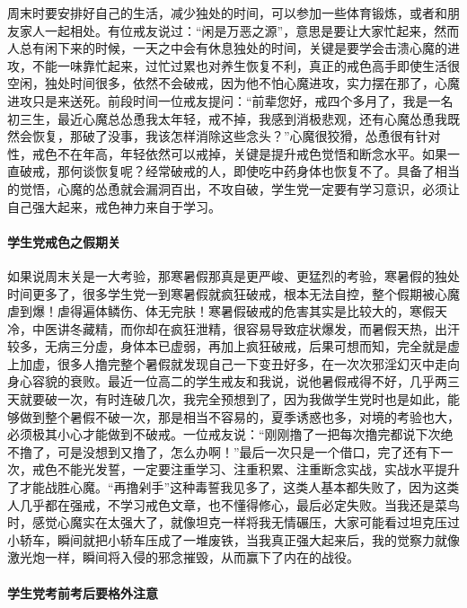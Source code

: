 周末时要安排好自己的生活，减少独处的时间，可以参加一些体育锻炼，或者和朋友家人一起相处。有位戒友说过：“闲是万恶之源”，意思是要让大家忙起来，然而人总有闲下来的时候，一天之中会有休息独处的时间，关键是要学会击溃心魔的进攻，不能一味靠忙起来，过忙过累也对养生恢复不利，真正的戒色高手即使生活很空闲，独处时间很多，依然不会破戒，因为他不怕心魔进攻，实力摆在那了，心魔进攻只是来送死。前段时间一位戒友提问：“前辈您好，戒四个多月了，我是一名初三生，最近心魔总怂恿我太年轻，戒不掉，我感到消极悲观，还有心魔怂恿我既然会恢复，那破了没事，我该怎样消除这些念头？”心魔很狡猾，怂恿很有针对性，戒色不在年高，年轻依然可以戒掉，关键是提升戒色觉悟和断念水平。如果一直破戒，那何谈恢复呢？经常破戒的人，即使吃中药身体也恢复不了。具备了相当的觉悟，心魔的怂恿就会漏洞百出，不攻自破，学生党一定要有学习意识，必须让自己强大起来，戒色神力来自于学习。

\paragraph{学生党戒色之假期关}

如果说周末关是一大考验，那寒暑假那真是更严峻、更猛烈的考验，寒暑假的独处时间更多了，很多学生党一到寒暑假就疯狂破戒，根本无法自控，整个假期被心魔虐到爆！虐得遍体鳞伤、体无完肤！寒暑假破戒的危害其实是比较大的，寒假天冷，中医讲冬藏精，而你却在疯狂泄精，很容易导致症状爆发，而暑假天热，出汗较多，无病三分虚，身体本已虚弱，再加上疯狂破戒，后果可想而知，完全就是虚上加虚，很多人撸完整个暑假就发现自己一下变丑好多，在一次次邪淫幻灭中走向身心容貌的衰败。最近一位高二的学生戒友和我说，说他暑假戒得不好，几乎两三天就要破一次，有时连破几次，我完全预想到了，因为我做学生党时也是如此，能够做到整个暑假不破一次，那是相当不容易的，夏季诱惑也多，对境的考验也大，必须极其小心才能做到不破戒。一位戒友说：“刚刚撸了一把每次撸完都说下次绝不撸了，可是没想到又撸了，怎么办啊！”最后一次只是一个借口，完了还有下一次，戒色不能光发誓，一定要注重学习、注重积累、注重断念实战，实战水平提升了才能战胜心魔。“再撸剁手”这种毒誓我见多了，这类人基本都失败了，因为这类人几乎都在强戒，不学习戒色文章，也不懂得修心，最后必定失败。当我还是菜鸟时，感觉心魔实在太强大了，就像坦克一样将我无情碾压，大家可能看过坦克压过小轿车，瞬间就把小轿车压成了一堆废铁，当我真正强大起来后，我的觉察力就像激光炮一样，瞬间将入侵的邪念摧毁，从而赢下了内在的战役。

\paragraph{学生党考前考后要格外注意}

